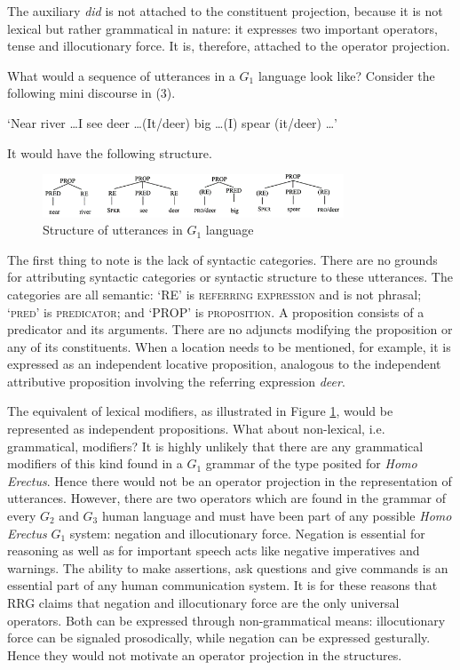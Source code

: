 \documentclass[output=paper,colorlinks,citecolor=brown]{langscibook}
\begin{document}
The auxiliary \emph{did} is not attached to the constituent projection, because it is not lexical but  rather grammatical in nature: it expresses two important operators, tense and illocutionary force.  It is, therefore, attached to the operator projection.

What would a sequence of utterances in a $G_1$ language look like?  Consider the following mini discourse in (3).

\ea ‘Near river \ldots  I see deer \ldots  (It/deer) big \ldots  (I) spear (it/deer) \ldots ’\z

It would have the following structure.
\begin{figure}
\centering
\includegraphics[width=0.8\textwidth]{vanvalin_figure2.png}
\caption{\label{fig:fig2}Structure of utterances in $G_1$ language}
\end{figure}

The first thing to note is the lack of syntactic categories.  There are no grounds for attributing syntactic categories or syntactic structure to these utterances.  The categories are all semantic: ‘RE’ is \textsc{referring expression} and is not phrasal; ‘\textsc{pred}’ is \textsc{predicator}; and ‘PROP’ is \textsc{proposition}.  A proposition consists of a predicator and its arguments. There are no adjuncts modifying the proposition or any of its constituents.  When a location needs to be mentioned, for example, it is expressed as an independent locative proposition, analogous to the independent attributive proposition involving the referring expression \emph{deer}.  

The equivalent of lexical modifiers, as illustrated in Figure \ref{fig:fig2}, would be represented as independent propositions.  What about non-lexical, i.e. grammatical, modifiers?  It is highly unlikely that there are any grammatical modifiers of this kind found in a $G_1$ grammar of the type posited for \emph{Homo Erectus}.  Hence there would not be an operator projection in the representation of utterances.  However, there are two operators which are found in the grammar of every $G_2$ and $G_3$ human language and must have been part of any possible \emph{Homo Erectus} $G_1$ system: negation and illocutionary force. Negation is essential for reasoning as well as for important speech acts like negative imperatives and warnings.  The ability to make assertions, ask questions and give commands is an essential part of any human communication system.  It is for these reasons that RRG claims that negation and illocutionary force are the only universal operators.  Both can be expressed through non-grammatical means: illocutionary force can be signaled prosodically, while negation can be expressed gesturally.  Hence they would not motivate an operator projection in the structures.
\end{document}
